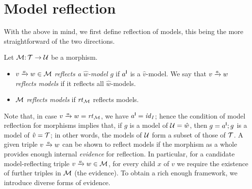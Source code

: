 \section{Model reflection}
\label{sec:reflection}

With the above in mind, we first define reflection of models, this being the more straightforward of the two directions.

\begin{definition}
Let ${\mathcal{M}}{:}\, {\mathcal{T}}\rightarrow{\mathcal{U}}$ be a morphism.
\begin{itemize}[topsep=\itemsep]
\item $\trip vaw\in\cM$ \emph{reflects a $\hat w$-model $g$} if $a^{\mathsf I}$ is a $\hat v$-model. We say that $\trip vaw$ \emph{reflects models} if it reflects all $\hat w$-models.

\item ${\mathcal{M}}$ \emph{reflects models} if $\mathit{rt}_{{\mathcal{M}}}$ reflects models.
\end{itemize}
\end{definition}
%
Note that, in case $\trip vaw=\rtof\cM$, we have $a^{\mathsf I}={\mathit{id}}_I$; hence the condition of model reflection for morphisms implies that, if $g$ is a model of ${\mathcal{U}}=\hat w$, then $g=a^{\mathsf I};g$ is a model of $\hat v={\mathcal{T}}$; in other words, the models of ${\mathcal{U}}$ form a subset of those of ${\mathcal{T}}$.
%
A given triple $\trip vaw$ can be shown to reflect models if the morphism as a whole provides enough internal \emph{evidence} for reflection. In particular, for a candidate model-reflecting triple $\trip vaw\in \cM$, for every child $x$ of $v$ we require the existence of further triples in ${\mathcal{M}}$ (the evidence). To obtain a rich enough framework, we introduce diverse forms of evidence.

